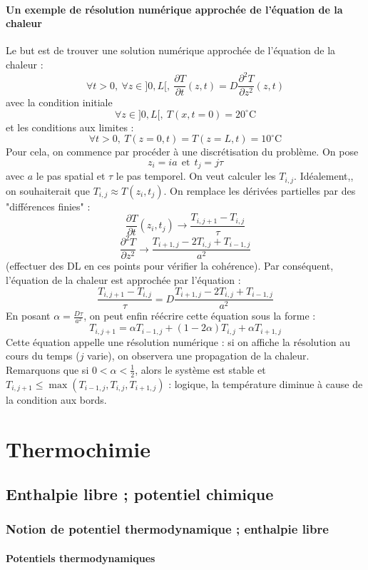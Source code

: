 \documentclass[french]{book}
\theoremstyle{plain}
\theoremstyle{definition}
\theoremstyle{remark}
\begin{document}
\subsection{Un exemple de résolution numérique approchée de l'équation de la chaleur}
Le but est de trouver une solution numérique approchée de l'équation de la chaleur : $$\forall t>0,\ \forall z\in]0,L[,\ \frac{\partial T}{\partial t}(z,t)=D\frac{\partial^2 T}{\partial z^2}(z,t)$$ avec la condition initiale $$\forall z\in]0,L[,\ T(x,t=0)=20^\circ\text{C}$$ et les conditions aux limites : $$\forall t>0,\ T(z=0,t)=T(z=L,t)=10^\circ\text{C}$$ Pour cela, on commence par procéder à une discrétisation du problème. On pose $$z_i=ia \ \ \text{et} \ \ t_j=j\tau$$ avec $a$ le pas spatial et $\tau$ le pas temporel. On veut calculer les $T_{i,j}$. Idéalement,, on souhaiterait que $T_{i,j}\approx T(z_i,t_j)$. On remplace les dérivées partielles par des "différences finies" : $$\frac{\partial T}{\partial t}(z_i,t_j)\longrightarrow\frac{T_{i,j+1}-T_{i,j}}{\tau}$$ $$\frac{\partial^2 T}{\partial z^2}\longrightarrow\frac{T_{i+1,j}-2T_{i,j}+T_{i-1,j}}{a^2}$$ (effectuer des DL en ces points pour vérifier la cohérence). Par conséquent, l'équation de la chaleur est approchée par l'équation : $$\frac{T_{i,j+1}-T_{i,j}}{\tau}=D\frac{T_{i+1,j}-2T_{i,j}+T_{i-1,j}}{a^2}$$ En posant $\displaystyle\alpha=\frac{D\tau}{a^2}$, on peut enfin réécrire cette équation sous la forme : $$T_{i,j+1}=\alpha T_{i-1,j}+(1-2\alpha)T_{i,j}+\alpha T_{i+1,j}$$ Cette équation appelle une résolution numérique : si on affiche la résolution au cours du temps ($j$ varie), on observera une propagation de la chaleur. Remarquons que si $0<\alpha<\displaystyle\frac{1}{2}$, alors le système est stable et $T_{i,j+1}\leqslant\max(T_{i-1,j},T_{i,j},T_{i+1,j})$ : logique, la température diminue à cause de la condition aux bords.

\part{Thermochimie}
\chapter{Enthalpie libre ; potentiel chimique}
\localtableofcontents
\section{Notion de potentiel thermodynamique ; enthalpie libre}
\subsection{Potentiels thermodynamiques}
\end{document}

